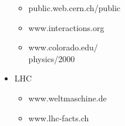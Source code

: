 \begin{frame}
\begin{footnotesize}
\begin{columns}[t]
\begin{column}{0.5\textwidth}
\begin{itemize}
\begin{itemize}
          \item public.web.cern.ch/public
          \item www.interactions.org
          \item www.colorado.edu/\\physics/2000
          \end{itemize}
        \item LHC
          \begin{itemize}
          \item www.weltmaschine.de
          \item www.lhc-facts.ch
          \end{itemize}
        \end{itemize}
      \end{column}
    \end{columns}
  \end{footnotesize}
\end{frame}
